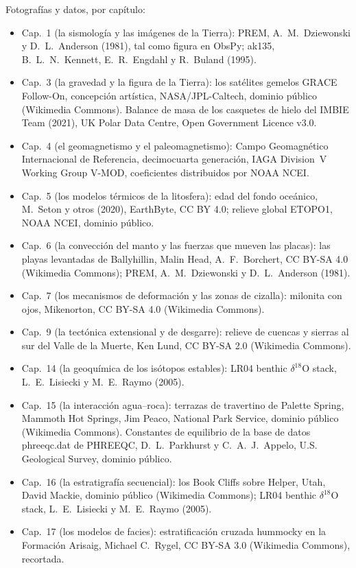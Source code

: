 \bigskip
\noindent Fotografías y datos, por capítulo:
\begin{itemize}\small
  \item Cap.~1 (la sismología y las imágenes de la Tierra): PREM, A.~M.~Dziewonski y D.~L.~Anderson (1981), tal como figura en ObsPy; ak135, B.~L.~N.~Kennett, E.~R.~Engdahl y R.~Buland (1995).
  \item Cap.~3 (la gravedad y la figura de la Tierra): los satélites gemelos GRACE Follow-On, concepción artística, NASA/JPL-Caltech, dominio público (Wikimedia Commons). Balance de masa de los casquetes de hielo del IMBIE Team (2021), UK Polar Data Centre, Open Government Licence v3.0.
  \item Cap.~4 (el geomagnetismo y el paleomagnetismo): Campo Geomagnético Internacional de Referencia, decimocuarta generación, IAGA Division~V Working Group V-MOD, coeficientes distribuidos por NOAA NCEI.
  \item Cap.~5 (los modelos térmicos de la litosfera): edad del fondo oceánico, M.~Seton y otros (2020), EarthByte, CC BY 4.0; relieve global ETOPO1, NOAA NCEI, dominio público.
  \item Cap.~6 (la convección del manto y las fuerzas que mueven las placas): las playas levantadas de Ballyhillin, Malin Head, A.~F.~Borchert, CC BY-SA 4.0 (Wikimedia Commons); PREM, A.~M.~Dziewonski y D.~L.~Anderson (1981).
  \item Cap.~7 (los mecanismos de deformación y las zonas de cizalla): milonita con ojos, Mikenorton, CC BY-SA 4.0 (Wikimedia Commons).
  \item Cap.~9 (la tectónica extensional y de desgarre): relieve de cuencas y sierras al sur del Valle de la Muerte, Ken Lund, CC BY-SA 2.0 (Wikimedia Commons).
  \item Cap.~14 (la geoquímica de los isótopos estables): LR04 benthic $\delta^{18}$O stack, L.~E.~Lisiecki y M.~E.~Raymo (2005).
  \item Cap.~15 (la interacción agua--roca): terrazas de travertino de Palette Spring, Mammoth Hot Springs, Jim Peaco, National Park Service, dominio público (Wikimedia Commons). Constantes de equilibrio de la base de datos phreeqc.dat de PHREEQC, D.~L.~Parkhurst y C.~A.~J.~Appelo, U.S. Geological Survey, dominio público.
  \item Cap.~16 (la estratigrafía secuencial): los Book Cliffs sobre Helper, Utah, David Mackie, dominio público (Wikimedia Commons); LR04 benthic $\delta^{18}$O stack, L.~E.~Lisiecki y M.~E.~Raymo (2005).
  \item Cap.~17 (los modelos de facies): estratificación cruzada hummocky en la Formación Arisaig, Michael C.~Rygel, CC BY-SA 3.0 (Wikimedia Commons), recortada.

\end{itemize}
